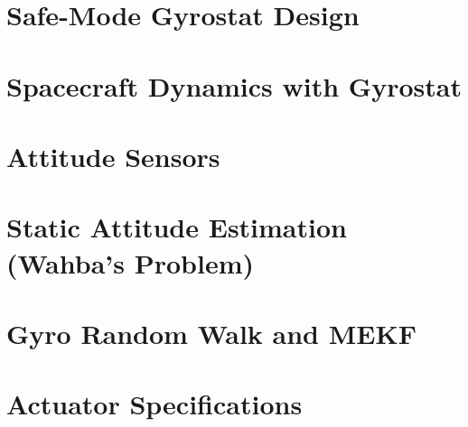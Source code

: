 \documentclass[11pt]{article}
\begin{document}
\section{Safe-Mode Gyrostat Design}

\section{Spacecraft Dynamics with Gyrostat}

\section{Attitude Sensors}


\section{Static Attitude Estimation (Wahba's Problem)}

\section{Gyro Random Walk and MEKF}


\section{Actuator Specifications}
\end{document}
